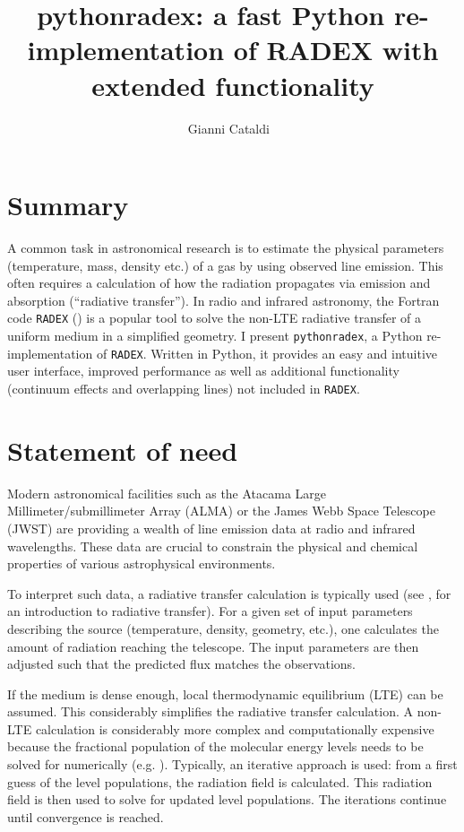 \documentclass[
]{article}
\title{pythonradex: a fast Python re-implementation of RADEX with
extended functionality}
\author[1]{Gianni Cataldi%
    \,\orcidlink{0000-0002-2700-9676}\,%
    }
\affil[1]{National Astronomical Observatory of Japan, 2-21-1 Osawa,
Mitaka, Tokyo 181-8588, Japan%
    \,\protect\href{https://ror.org/052rrw050}{\protect\rorlogo}\,%
  }
\begin{document}
\maketitle

\section{Summary}\label{summary}

A common task in astronomical research is to estimate the physical
parameters (temperature, mass, density etc.) of a gas by using observed
line emission. This often requires a calculation of how the radiation
propagates via emission and absorption (``radiative transfer''). In
radio and infrared astronomy, the Fortran code \texttt{RADEX}
() is a popular
tool to solve the non-LTE radiative transfer of a uniform medium in a
simplified geometry. I present \texttt{pythonradex}, a Python re-implementation of
\texttt{RADEX}. Written in Python, it provides an
easy and intuitive user interface, improved performance as well as
additional functionality (continuum
effects and overlapping lines) not included in \texttt{RADEX}.

\section{Statement of need}\label{statement-of-need}

Modern astronomical facilities such as the Atacama Large
Millimeter/submillimeter Array (ALMA) or the James Webb Space Telescope
(JWST) are providing a wealth of line emission data at radio and
infrared wavelengths. These data are crucial to constrain the physical
and chemical properties of various astrophysical environments.

To interpret such data, a radiative transfer calculation is typically
used (see , for an
introduction to radiative transfer). For a given set of input parameters
describing the source (temperature, density, geometry, etc.), one
calculates the amount of radiation reaching the telescope. The input
parameters are then adjusted such that the predicted flux matches the
observations.

If the medium is dense enough, local thermodynamic equilibrium (LTE) can
be assumed. This considerably simplifies the radiative transfer
calculation. A non-LTE calculation is considerably more complex and
computationally expensive because the fractional population of the
molecular energy levels needs to be solved for numerically (e.g.
). Typically, an
iterative approach is used: from a first guess of the level populations,
the radiation field is calculated. This radiation field is then used to
solve for updated level populations. The iterations continue until
convergence is reached.
\end{document}
